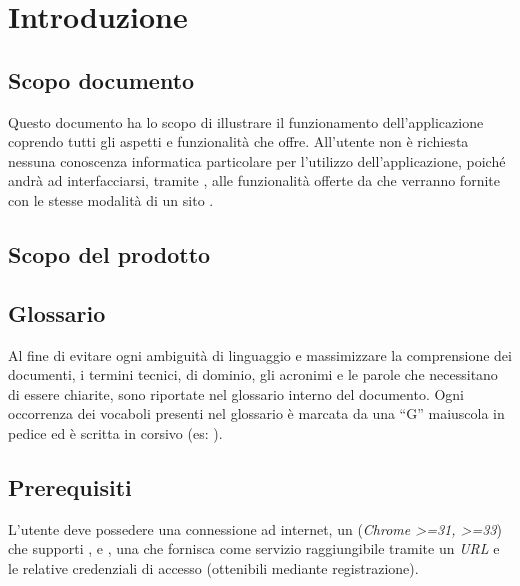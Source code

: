 \section{Introduzione} \label{intro}
\subsection{Scopo documento}
Questo documento ha lo scopo di illustrare il funzionamento dell'applicazione \Premi coprendo tutti gli aspetti e funzionalità che offre. All'utente non è richiesta nessuna conoscenza informatica particolare per l'utilizzo dell'applicazione, poiché andrà ad interfacciarsi, tramite , alle funzionalità offerte da \Premi che verranno fornite con le stesse modalità di un sito .
\subsection{Scopo del prodotto}
\scopoProdotto
\subsection{Glossario} %
Al fine di evitare ogni ambiguità di linguaggio e massimizzare la comprensione dei documenti, i termini tecnici, di dominio, gli acronimi e le parole che necessitano di essere chiarite, sono riportate nel glossario interno del documento. Ogni occorrenza dei vocaboli presenti nel glossario è marcata da una ``G'' maiuscola in pedice ed è scritta in corsivo (es: ).
\subsection{Prerequisiti}
L'utente deve possedere una connessione ad internet, un  (\textit{Chrome >=31,  >=33}) che supporti ,  e , una  che fornisca \Premi come servizio raggiungibile tramite un \textit{URL} e le relative credenziali di accesso (ottenibili mediante registrazione).
